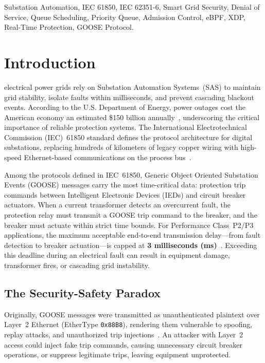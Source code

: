 \documentclass[journal]{IEEEtran}
\begin{document}
\begin{IEEEkeywords}
Substation Automation, IEC 61850, IEC 62351-6, Smart Grid Security, Denial of Service, Queue Scheduling, Priority Queue, Admission Control, eBPF, XDP, Real-Time Protection, GOOSE Protocol.
\end{IEEEkeywords}

\section{Introduction}
 electrical power grids rely on Substation Automation Systems~(SAS) to maintain grid stability, isolate faults within milliseconds, and prevent cascading blackout events. According to the U.S. Department of Energy, power outages cost the American economy an estimated \$150 billion annually~\cite{parviz2022dos}, underscoring the critical importance of reliable protection systems. The International Electrotechnical Commission (IEC)~61850 standard defines the protocol architecture for digital substations, replacing hundreds of kilometers of legacy copper wiring with high-speed Ethernet-based communications on the process bus~\cite{iec61850}.

Among the protocols defined in IEC~61850, Generic Object Oriented Substation Events (GOOSE) messages carry the most time-critical data: protection trip commands between Intelligent Electronic Devices (IEDs) and circuit breaker actuators. When a current transformer detects an overcurrent fault, the protection relay must transmit a GOOSE trip command to the breaker, and the breaker must actuate within strict time bounds. For Performance Class~P2/P3 applications, the maximum acceptable end-to-end transmission delay---from fault detection to breaker actuation---is capped at \textbf{3 milliseconds (ms)}~\cite{iec61850}. Exceeding this deadline during an electrical fault can result in equipment damage, transformer fires, or cascading grid instability.

\subsection{The Security-Safety Paradox}
Originally, GOOSE messages were transmitted as unauthenticated plaintext over Layer~2 Ethernet (EtherType \texttt{0x88B8}), rendering them vulnerable to spoofing, replay attacks, and unauthorized trip injections~\cite{schuster2017goose, hong2014cyber}. An attacker with Layer~2 access could inject fake trip commands, causing unnecessary circuit breaker operations, or suppress legitimate trips, leaving equipment unprotected.
\end{document}

